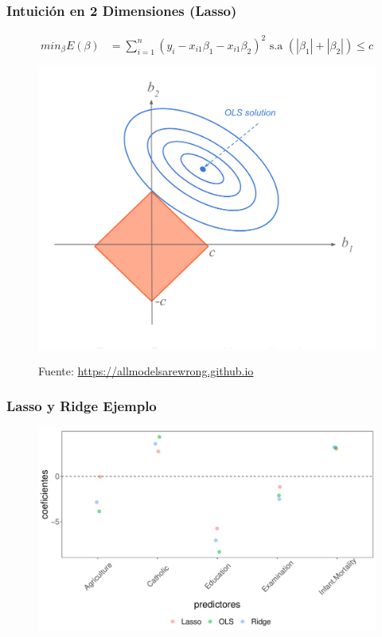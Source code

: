 \documentclass[
  shownotes,
  xcolor={svgnames},
  hyperref={colorlinks,citecolor=DarkBlue,linkcolor=DarkRed,urlcolor=DarkBlue}
  , aspectratio=169]{beamer}
\begin{document}
\begin{frame}[fragile]
\frametitle{Intuición en 2 Dimensiones (Lasso)}

\begin{align}
     min_{\beta} E(\beta) &= \sum_{i=1}^n (y_i - x_{i1}\beta_1 - x_{i1}\beta_2)^2  \text{ s.a }   \left( |\beta_1| + |\beta_2| \right) \leq c 
  \end{align}

\begin{figure}[H] \centering
            \captionsetup{justification=centering}
              \includegraphics[scale=0.4]{figures/lasso_ridge2}
 
\tiny
Fuente: \url{https://allmodelsarewrong.github.io}
\end{figure}




\end{frame}
\begin{frame}[fragile]
\frametitle{Lasso y Ridge Ejemplo}

   \begin{figure}[H] \centering
            \captionsetup{justification=centering}
              \includegraphics[scale=0.6]{figures/comp}
 \end{figure}

 \end{frame}
\end{document}
